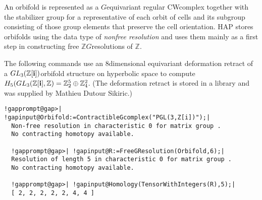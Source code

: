 \documentclass[a4paper,11pt]{report}
\begin{document}
{{An orbifold is represented as a $G$\texttt{}equivariant regular CW\texttt{}complex together
with the stabilizer group for a representative of each orbit of cells and its
subgroup consisting of those group elements that preserve the cell
orientation. \textsc{HAP} stores orbifolds using the data type of \emph{non\texttt{}free resolution} and uses them mainly as a first step in constructing free $\mathbb ZG$\texttt{}resolutions of $\mathbb Z$. 

 The following commands use an $8$\texttt{}dimensional equivariant deformation retract of a $GL_3(\mathbb Z[{\bf i}])$\texttt{}orbifold structure on hyperbolic space to compute $H_5(GL_3({\mathbb Z}[{\bf i}],\mathbb Z) = \mathbb Z_2^5\oplus \mathbb Z_4^2$. (The deformation retract is stored in a library and was supplied by Mathieu
Dutour Sikiric.) 
\begin{Verbatim}[commandchars=!@|,fontsize=\small,frame=single,label=Example]
  !gapprompt@gap>| !gapinput@Orbifold:=ContractibleGcomplex("PGL(3,Z[i])");|
  Non-free resolution in characteristic 0 for matrix group . 
  No contracting homotopy available. 
  
  !gapprompt@gap>| !gapinput@R:=FreeGResolution(Orbifold,6);|
  Resolution of length 5 in characteristic 0 for matrix group . 
  No contracting homotopy available. 
  
  !gapprompt@gap>| !gapinput@Homology(TensorWithIntegers(R),5);|
  [ 2, 2, 2, 2, 2, 4, 4 ]
  

\end{Verbatim}}}
\end{document}
